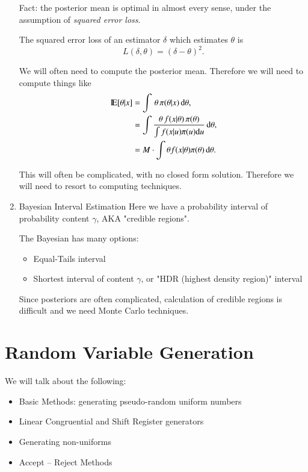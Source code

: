 \documentclass[11pt,english]{scrbook}
\begin{document}
\begin{enumerate}
Fact: the posterior mean is optimal in almost every sense, under the assumption of \emph{squared error loss}.

The squared error loss of an estimator \(\delta\) which estimates \(\theta\) is 
\[
L(\delta,\theta) = (\delta - \theta)^{2}.
\]

We will often need to compute the posterior mean.  Therefore we will need to compute things like
\begin{align*}
\mathrm{I\hspace{-1.5pt}E} [\theta|x] &= \int \, \theta\, \pi(\theta|x)\,\mathrm{d} \theta,  \\
&= \int \frac{\theta\, f(x|\theta)\,\pi(\theta)}{\int f(x|u)\pi(u)\mathrm{d} u} \,\mathrm{d} \theta, \\
&= M \cdot \int \theta f(x|\theta)\pi(\theta)\,\mathrm{d} \theta.
\end{align*}

This will often be complicated, with no closed form solution.  Therefore we will need to resort to computing techniques.

\item Bayesian Interval Estimation
\label{sec:org6c360e4}
Here we have a probability interval of probability content \(\gamma\), AKA "credible regions".

The Bayesian has many options:

\begin{itemize}
\item Equal-Tails interval

\item Shortest interval of content \(\gamma\), or "HDR (highest density region)" interval
\end{itemize}

Since posteriors are often complicated, calculation of credible regions is difficult and we need Monte Carlo techniques.
\end{enumerate}


\chapter{Random Variable Generation}
\label{sec:orgea3f53a}
We will talk about the following:

\begin{itemize}
\item Basic Methods: generating pseudo-random uniform numbers
\item Linear Congruential and Shift Register generators
\item Generating non-uniforms
\item Accept – Reject Methods
\end{itemize}
\end{document}
